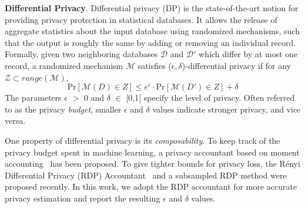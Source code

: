 \documentclass[conference]{IEEEtran}
\newcommand{\partitle}[1]{\smallskip \noindent \textbf{#1}.}
\begin{document}
\partitle{Differential Privacy} Differential privacy (DP) \cite{dwork_book} is the state-of-the-art notion for providing privacy protection in statistical databases. It allows the release of aggregate statistics about the input database using randomized mechanisms, such that the output is roughly the same by adding or removing an individual record. Formally, given two neighboring databases $\mathcal{D}$ and $\mathcal{D}'$ which differ by at most one record, a randomized mechanism $\mathcal{M}$ satisfies ($\epsilon, \delta$)-differential privacy \cite{dwork_book} if for any $\mathcal{Z} \subset range(\mathcal{M})$,
\begin{equation}
 \text{Pr}[\mathcal{M}(D) \in {Z}] \leq e^{\epsilon} \cdot \text{Pr}[\mathcal{M}(D') \in {Z}] + \delta
\end{equation}
The parameters $\epsilon$ $>$ 0 and $\delta$ $\in$ [0,1] specify the level of privacy. Often referred to as the privacy \textit{budget}, smaller $\epsilon$ and $\delta$ values indicate stronger privacy, and vice versa. %


One property of differential privacy is its \textit{composability}. To keep track of the privacy budget spent in machine learning, a privacy accountant based on moment accounting~\cite{DPSGD2016Abadi} has been proposed.  To give tighter bounds for privacy loss, the Rényi Differential Privacy (RDP) Accountant~\cite{MironovRDP2017} and a subsampled RDP method \cite{WangRDP2018} were proposed recently. In this work, we adopt the RDP accountant for more accurate privacy estimation and report the resulting $\epsilon$ and $\delta$ values. 


\end{document}
